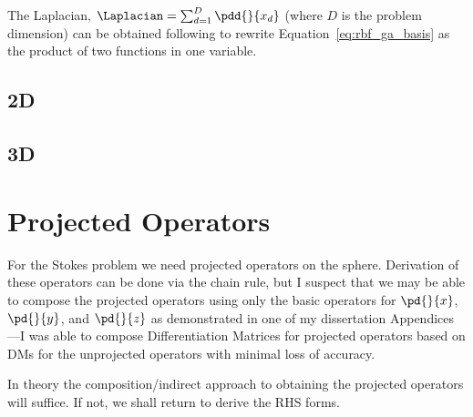 \documentclass[11pt]{report}
\begin{document}
{The Laplacian, $\Laplacian = \sum_{d=1}^{D}  \pdd{}{x_d}$ (where $D$ is the problem dimension) can be obtained following \cite{FornbergLehtoPowell12} to rewrite Equation~\ref{eq:rbf_ga_basis} as the product of two functions in one variable. 

\subsection{2D}

\subsection{3D}


\section{Projected Operators}

For the Stokes problem we need projected operators on the sphere. Derivation of these operators can be done via the chain rule, but I suspect that we may be able to compose the projected operators using only the basic operators for $\pd{}{x}$,  $\pd{}{y}$, and $\pd{}{z}$ as demonstrated in one of my dissertation Appendices---I was able to compose Differentiation Matrices for projected operators based on DMs for the unprojected operators with minimal loss of accuracy. 

In theory the composition/indirect approach to obtaining the projected operators will suffice. If not, we shall return to derive the RHS forms. 


}

%
%
\end{document}
